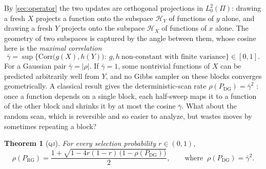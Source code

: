 \documentclass[11pt]{article}
\newtheorem{theorem}{Theorem}
\theoremstyle{remark}
\newcommand{\QJ}{\textsc{qj}}
\newcommand{\DG}{\mathrm{DG}}
\newcommand{\RG}{\mathrm{RG}}
\begin{document}
By \cref{sec:operator} the two updates are orthogonal projections in $L_0^2(\Pi)$: drawing a fresh $X$ projects a function onto the subspace $\mathcal H_Y$ of functions of $y$ alone, and drawing a fresh $Y$ projects onto the subspace $\mathcal H_X$ of functions of $x$ alone. The geometry of two subspaces is captured by the angle between them, whose cosine here is the \emph{maximal correlation}
\[
\bar\gamma=\sup\bigl\{\mathrm{Corr}\bigl(g(X),h(Y)\bigr):\ g,h\ \text{non-constant with finite variance}\bigr\}\in[0,1].
\]
For a Gaussian pair $\bar\gamma=|\rho|$. If $\bar\gamma=1$, some nontrivial functions of $X$ can be predicted arbitrarily well from $Y$, and no Gibbs sampler on these blocks converges geometrically. A classical result gives the deterministic-scan rate $\rho(P_\DG)=\bar\gamma^2$ \citep{liu1994covariance}: once a function depends on a single block, each half-sweep maps it to a function of the other block and shrinks it by at most the cosine $\bar\gamma$. What about the random scan, which is reversible and so easier to analyze, but wastes moves by sometimes repeating a block?

\begin{theorem}[\QJ]\label{thm:qj}
For every selection probability $r\in(0,1)$,
\[
\rho(P_\RG)=\frac{1+\sqrt{1-4r(1-r)\,\bigl(1-\rho(P_\DG)\bigr)}}{2},\qquad\text{where }\ \rho(P_\DG)=\bar\gamma^2.
\]
\end{theorem}
\end{document}

